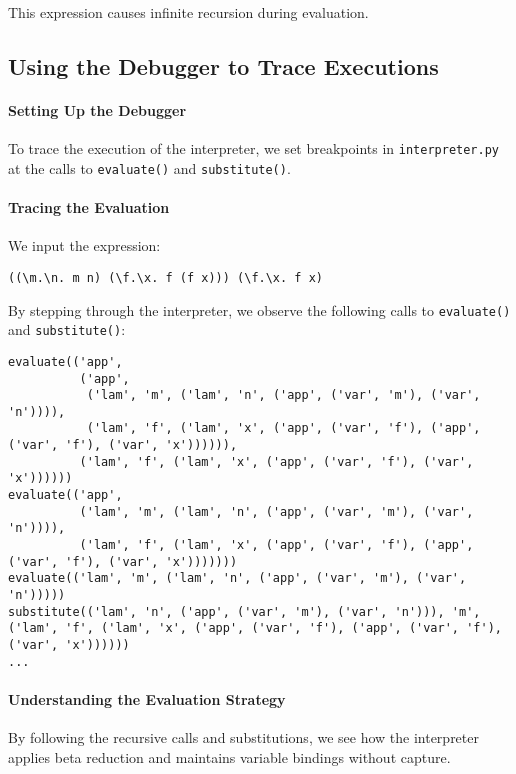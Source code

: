 \documentclass{article}
\theoremstyle{theorem}
\theoremstyle{definition}
\theoremstyle{remark}
\begin{document}
This expression causes infinite recursion during evaluation.

\subsection{Using the Debugger to Trace Executions}

\paragraph{Setting Up the Debugger}

To trace the execution of the interpreter, we set breakpoints in \texttt{interpreter.py} at the calls to \texttt{evaluate()} and \texttt{substitute()}.

\paragraph{Tracing the Evaluation}

We input the expression:

\begin{verbatim}
((\m.\n. m n) (\f.\x. f (f x))) (\f.\x. f x)
\end{verbatim}

By stepping through the interpreter, we observe the following calls to \texttt{evaluate()} and \texttt{substitute()}:

\begin{verbatim}
evaluate(('app',
          ('app',
           ('lam', 'm', ('lam', 'n', ('app', ('var', 'm'), ('var', 'n')))),
           ('lam', 'f', ('lam', 'x', ('app', ('var', 'f'), ('app', ('var', 'f'), ('var', 'x')))))),
          ('lam', 'f', ('lam', 'x', ('app', ('var', 'f'), ('var', 'x'))))))
evaluate(('app',
          ('lam', 'm', ('lam', 'n', ('app', ('var', 'm'), ('var', 'n')))),
          ('lam', 'f', ('lam', 'x', ('app', ('var', 'f'), ('app', ('var', 'f'), ('var', 'x')))))))
evaluate(('lam', 'm', ('lam', 'n', ('app', ('var', 'm'), ('var', 'n')))))
substitute(('lam', 'n', ('app', ('var', 'm'), ('var', 'n'))), 'm', ('lam', 'f', ('lam', 'x', ('app', ('var', 'f'), ('app', ('var', 'f'), ('var', 'x'))))))
...
\end{verbatim}

\paragraph{Understanding the Evaluation Strategy}

By following the recursive calls and substitutions, we see how the interpreter applies beta reduction and maintains variable bindings without capture.
\end{document}
